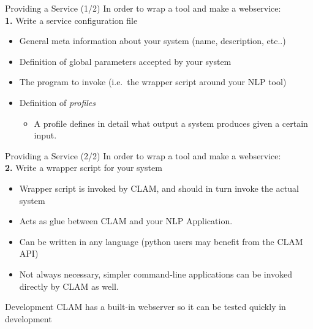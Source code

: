 \documentclass[xcolor=table,10pt,t]{beamer}
\begin{document}
\begin{frame}
    \begin{block}{Providing a Service (1/2)}
        In order to wrap a tool and make a webservice: \\       
        \textbf{1.} Write a service configuration file
        \begin{itemize}
            \item General meta information about your system {\footnotesize{(name, description, etc..)}}
            \item Definition of global parameters accepted by your system
            \item The program to invoke {\footnotesize{(i.e.\ the wrapper script around your NLP tool)}}
            \item Definition of \emph{profiles}
            \begin{itemize}
                \item A profile defines in detail what output a system produces given a certain input.                    
            \end{itemize}
        \end{itemize}    
    
    \end{block}

\end{frame}            

\begin{frame}
    \begin{block}{Providing a Service (2/2)}
        In order to wrap a tool and make a webservice: \\
        \textbf{2.} Write a wrapper script for your system
        \begin{itemize}
            \item Wrapper script is invoked by CLAM, and should in turn invoke the actual system
            \item Acts as glue between CLAM and your NLP Application.
            \item Can be written in any language (python users may benefit from the CLAM API)
            \item Not always necessary, simpler command-line applications can be invoked directly by CLAM as well.
        \end{itemize}
    \end{block}

    \begin{block}{Development}
        CLAM has a built-in webserver so it can be tested quickly in
        development
    \end{block}

\end{frame}
\end{document}
